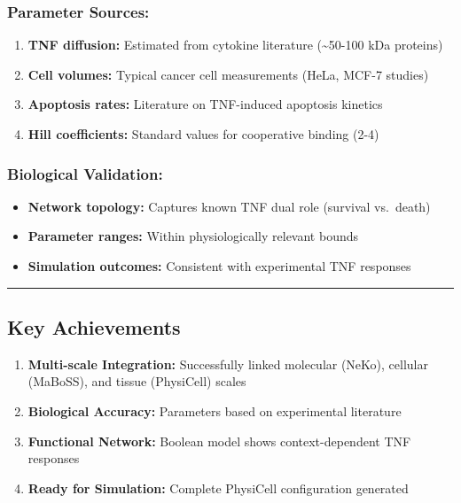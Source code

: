 \hypertarget{parameter-sources}{%
\subsubsection{Parameter Sources:}\label{parameter-sources}}

\begin{enumerate}
\def\labelenumi{\arabic{enumi}.}
\tightlist
\item
  \textbf{TNF diffusion:} Estimated from cytokine literature
  (\textasciitilde50-100 kDa proteins)
\item
  \textbf{Cell volumes:} Typical cancer cell measurements (HeLa, MCF-7
  studies)
\item
  \textbf{Apoptosis rates:} Literature on TNF-induced apoptosis kinetics
\item
  \textbf{Hill coefficients:} Standard values for cooperative binding
  (2-4)
\end{enumerate}

\hypertarget{biological-validation}{%
\subsubsection{Biological Validation:}\label{biological-validation}}

\begin{itemize}
\tightlist
\item
  \textbf{Network topology:} Captures known TNF dual role (survival
  vs.~death)
\item
  \textbf{Parameter ranges:} Within physiologically relevant bounds
\item
  \textbf{Simulation outcomes:} Consistent with experimental TNF
  responses
\end{itemize}

\begin{center}\rule{0.5\linewidth}{0.5pt}\end{center}

\hypertarget{key-achievements}{%
\subsection{Key Achievements}\label{key-achievements}}

\begin{enumerate}
\def\labelenumi{\arabic{enumi}.}
\tightlist
\item
  \textbf{Multi-scale Integration:} Successfully linked molecular
  (NeKo), cellular (MaBoSS), and tissue (PhysiCell) scales
\item
  \textbf{Biological Accuracy:} Parameters based on experimental
  literature
\item
  \textbf{Functional Network:} Boolean model shows context-dependent TNF
  responses
\item
  \textbf{Ready for Simulation:} Complete PhysiCell configuration
  generated
\end{enumerate}

